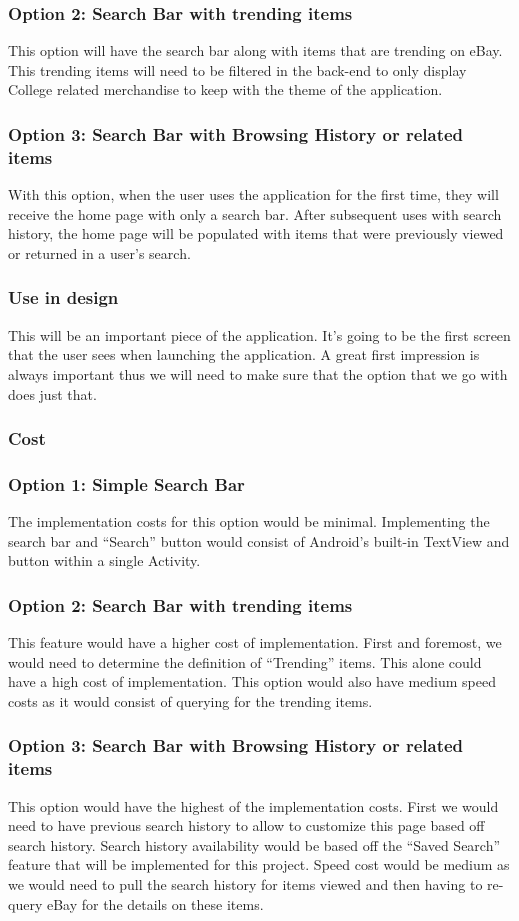 \documentclass[journal,compsoc, 10pt, draftclsnofoot, onecolumn]{IEEEtran}
\begin{document}
\subsubsection*{Option 2: Search Bar with trending items}
This option will have the search bar along with items that are trending on eBay. 
This trending items will need to be filtered in the back-end to only display College 
related merchandise to keep with the theme of the application. 
\subsubsection*{Option 3: Search Bar with Browsing History or related items}
With this option, when the user uses the application for the first time, they 
will receive the home page with only a search bar. After subsequent uses with 
search history, the home page will be populated with items that were previously 
viewed or returned in a user's search.  
\subsubsection*{Use in design}
This will be an important piece of the application. It's going to be the first 
screen that the user sees when launching the application. A great first 
impression is always important thus we will need to make sure that the option 
that we go with does just that.
\subsubsection*{Cost}
\subsubsection*{Option 1: Simple Search Bar}
The implementation costs for this option would be minimal. Implementing the 
search bar and ``Search'' button would consist of Android's built-in TextView 
and button within a single Activity. 
\subsubsection*{Option 2: Search Bar with trending items}
This feature would have a higher cost of implementation. First and foremost, we 
would need to determine the definition of ``Trending'' items. This alone could 
have a high cost of implementation. This option would also have medium speed 
costs as it would consist of querying for the trending items.
\subsubsection*{Option 3: Search Bar with Browsing History or related items}
This option would have the highest of the implementation costs. First we would 
need to have previous search history to allow to customize this page based off 
search history. Search history availability would be based off the ``Saved 
Search'' feature that will be implemented for this project. Speed cost would 
be medium as we would need to pull the search history for items viewed and then 
having to re-query eBay for the details on these items. 
\end{document}
